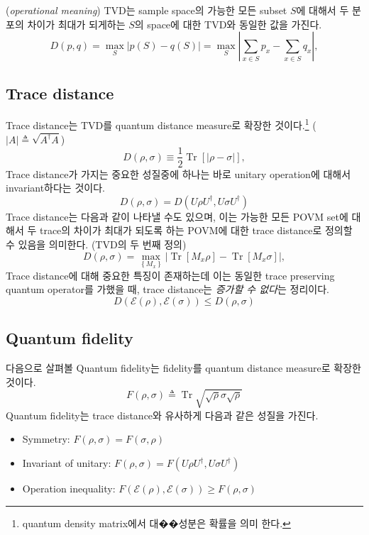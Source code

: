 (\textit{operational meaning}) TVD는 sample space의 가능한 모든 subset $S$에 대해서 두 분포의 차이가 최대가 되게하는 $S$의 space에 대한 TVD와 동일한 값을 가진다.
\begin{equation*}
    D(p, q)=\max _S|p(S)-q(S)|=\max _S\left|\sum_{x \in S} p_x-\sum_{x \in S} q_x\right|,
\end{equation*}


\subsection{Trace distance}
Trace distance는 TVD를 quantum distance measure로 확장한 것이다.\footnote{quantum density matrix에서 대��성분은 확률을 의미 한다.} ($|A| \triangleq \sqrt{A^\dagger A}$)
\begin{equation*}
    D(\rho, \sigma) \equiv \frac{1}{2} \operatorname{Tr}[|\rho-\sigma|],
\end{equation*}
Trace distance가 가지는 중요한 성질중에 하나는 바로 unitary operation에 대해서 invariant하다는 것이다.
\begin{equation*}
    D(\rho, \sigma)=D(U\rho U^\dagger, U\sigma U^\dagger)
\end{equation*}
Trace distance는 다음과 같이 나타낼 수도 있으며, 이는 가능한 모든 POVM set에 대해서 두 trace의 차이가 최대가 되도록 하는 POVM에 대한 trace distance로 정의할 수 있음을 의미한다. (TVD의 두 번째 정의)
\begin{equation*}
    D(\rho, \sigma)=\max _{\left\{M_x\right\}}\left|\operatorname{Tr}\left[M_x \rho\right]-\operatorname{Tr}\left[M_x \sigma\right]\right|,
\end{equation*}
Trace distance에 대해 중요한 특징이 존재하는데 이는 동일한 trace preserving quantum operator를 가했을 때, trace distance는 \textit{증가할 수 없다}는 정리이다.
\begin{equation*}
    D(\mathcal{E}(\rho), \mathcal{E}(\sigma)) \leq D(\rho, \sigma) 
\end{equation*}

\subsection{Quantum fidelity} \label{sec:quantum-fidelity}
다음으로 살펴볼 Quantum fidelity는 fidelity를 quantum distance measure로 확장한 것이다.
\begin{equation*}
    F(\rho, \sigma) \triangleq \operatorname{Tr} \sqrt{\sqrt{\rho} \sigma \sqrt{\rho}}
\end{equation*}
Quantum fidelity는 trace distance와 유사하게 다음과 같은 성질을 가진다.
\begin{itemize}
    \item Symmetry: $F(\rho, \sigma)=F(\sigma, \rho)$
    \item Invariant of unitary: $F(\rho, \sigma)=F(U\rho U^\dagger, U\sigma U^\dagger)$
    \item Operation inequality: $F(\mathcal{E}(\rho), \mathcal{E}(\sigma)) \geq F(\rho, \sigma)$
\end{itemize}

